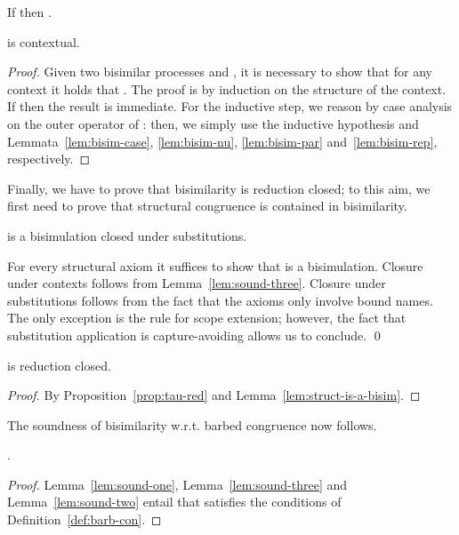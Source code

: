 \documentclass{LMCS}
\begin{document}
\begin{lem}
\label{lem:bisim-rep}
If  then .
\end{lem}

\begin{lem}
\label{lem:sound-three}
 is contextual.
\end{lem}
\begin{proof}
Given two bisimilar processes  and , it is necessary to show that for any context 
 it holds that .
The proof is by induction on the structure of the context.
If  then the result is immediate.
For the inductive step, we reason by case analysis on the outer operator of :
then, we simply use the inductive hypothesis and Lemmata~\ref{lem:bisim-case}, \ref{lem:bisim-nu},
\ref{lem:bisim-par} and~\ref{lem:bisim-rep}, respectively.
\end{proof}

Finally, we have to prove that bisimilarity is reduction closed; to this aim, we first need
to prove that structural congruence is contained in bisimilarity.

\begin{lem}
\label{lem:struct-is-a-bisim}
 is a bisimulation closed under substitutions.
\end{lem}
\proof
For every structural axiom  it suffices to show that 
is a bisimulation. Closure under contexts follows from Lemma~\ref{lem:sound-three}. Closure under
substitutions follows from the fact that the axioms only involve bound names. The only exception 
is the rule for scope extension; however, the fact that substitution application is capture-avoiding
allows us to conclude.
\qed

\begin{lem}
\label{lem:sound-two}
 is reduction closed.
\end{lem}
\begin{proof}
By Proposition~\ref{prop:tau-red} and Lemma~\ref{lem:struct-is-a-bisim}.
\end{proof}


The soundness of bisimilarity w.r.t. barbed congruence now follows.

\begin{thm}
\label{thm: sound}
.
\end{thm}
\begin{proof}
Lemma~\ref{lem:sound-one}, Lemma~\ref{lem:sound-three} and Lemma~\ref{lem:sound-two}
entail that  satisfies the conditions of Definition~\ref{def:barb-con}.
\end{proof}
\end{document}

